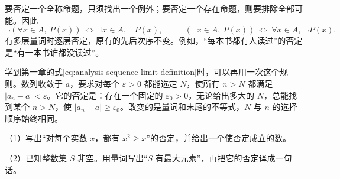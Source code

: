 要否定一个全称命题，只须找出一个例外；要否定一个存在命题，则要排除全部可能。因此
\[
 \neg(\forall x\in A,\ P(x))\ \Leftrightarrow\ \exists x\in A,\ \neg P(x),\qquad
 \neg(\exists x\in A,\ P(x))\ \Leftrightarrow\ \forall x\in A,\ \neg P(x).
\]
有多层量词时逐层否定，原有的先后次序不变。例如，“每本书都有人读过”的否定是“有一本书谁都没读过”。

学到第一章的式\eqref{eq:analysis-sequence-limit-definition}时，可以再用一次这个规则。数列收敛于 \(a\)，要求对每个 \(\varepsilon>0\) 都能选定 \(N\)，使所有 \(n>N\) 都满足 \(|a_n-a|<\varepsilon\)。它的否定是：存在一个固定的 \(\varepsilon_0>0\)，无论给出多大的 \(N\)，总能找到某个 \(n>N\)，使 \(|a_n-a|\geq\varepsilon_0\)。改变的是量词和末尾的不等式，\(N\) 与 \(n\) 的选择顺序始终相同。

\begin{exercise}
\mbox{}\par\nobreak

（1）写出“对每个实数 \(x\)，都有 \(x^2\geq x\)”的否定，并给出一个使否定成立的数。

（2）已知整数集 \(S\) 非空。用量词写出“\(S\) 有最大元素”，再把它的否定译成一句话。
\end{exercise}
\endgroup
